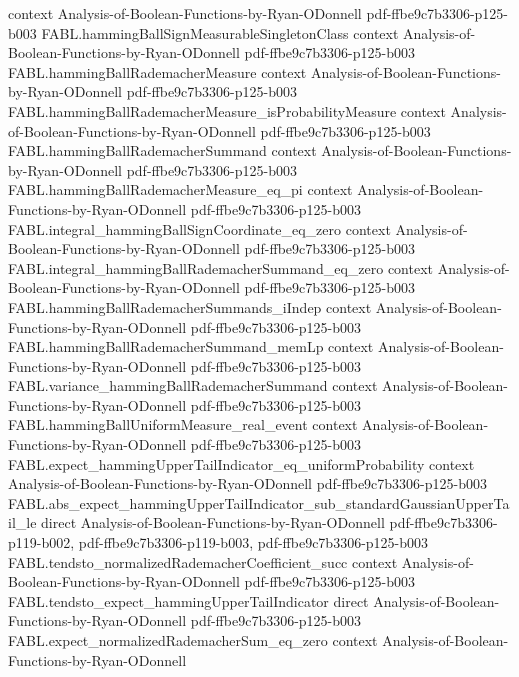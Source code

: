 \begin{theorem}
  {context}
  {Analysis-of-Boolean-Functions-by-Ryan-ODonnell}
  {pdf-ffbe9c7b3306-p125-b003}
\proofstep
  {FABL.hammingBallSignMeasurableSingletonClass}
  {context}
  {Analysis-of-Boolean-Functions-by-Ryan-ODonnell}
  {pdf-ffbe9c7b3306-p125-b003}
\proofstep
  {FABL.hammingBallRademacherMeasure}
  {context}
  {Analysis-of-Boolean-Functions-by-Ryan-ODonnell}
  {pdf-ffbe9c7b3306-p125-b003}
\proofstep
  {FABL.hammingBallRademacherMeasure_isProbabilityMeasure}
  {context}
  {Analysis-of-Boolean-Functions-by-Ryan-ODonnell}
  {pdf-ffbe9c7b3306-p125-b003}
\proofstep
  {FABL.hammingBallRademacherSummand}
  {context}
  {Analysis-of-Boolean-Functions-by-Ryan-ODonnell}
  {pdf-ffbe9c7b3306-p125-b003}
\proofstep
  {FABL.hammingBallRademacherMeasure_eq_pi}
  {context}
  {Analysis-of-Boolean-Functions-by-Ryan-ODonnell}
  {pdf-ffbe9c7b3306-p125-b003}
\proofstep
  {FABL.integral_hammingBallSignCoordinate_eq_zero}
  {context}
  {Analysis-of-Boolean-Functions-by-Ryan-ODonnell}
  {pdf-ffbe9c7b3306-p125-b003}
\proofstep
  {FABL.integral_hammingBallRademacherSummand_eq_zero}
  {context}
  {Analysis-of-Boolean-Functions-by-Ryan-ODonnell}
  {pdf-ffbe9c7b3306-p125-b003}
\proofstep
  {FABL.hammingBallRademacherSummands_iIndep}
  {context}
  {Analysis-of-Boolean-Functions-by-Ryan-ODonnell}
  {pdf-ffbe9c7b3306-p125-b003}
\proofstep
  {FABL.hammingBallRademacherSummand_memLp}
  {context}
  {Analysis-of-Boolean-Functions-by-Ryan-ODonnell}
  {pdf-ffbe9c7b3306-p125-b003}
\proofstep
  {FABL.variance_hammingBallRademacherSummand}
  {context}
  {Analysis-of-Boolean-Functions-by-Ryan-ODonnell}
  {pdf-ffbe9c7b3306-p125-b003}
\proofstep
  {FABL.hammingBallUniformMeasure_real_event}
  {context}
  {Analysis-of-Boolean-Functions-by-Ryan-ODonnell}
  {pdf-ffbe9c7b3306-p125-b003}
\proofstep
  {FABL.expect_hammingUpperTailIndicator_eq_uniformProbability}
  {context}
  {Analysis-of-Boolean-Functions-by-Ryan-ODonnell}
  {pdf-ffbe9c7b3306-p125-b003}
\proofstep
  {FABL.abs_expect_hammingUpperTailIndicator_sub_standardGaussianUpperTail_le}
  {direct}
  {Analysis-of-Boolean-Functions-by-Ryan-ODonnell}
  {pdf-ffbe9c7b3306-p119-b002,
    pdf-ffbe9c7b3306-p119-b003,
    pdf-ffbe9c7b3306-p125-b003}
\proofstep
  {FABL.tendsto_normalizedRademacherCoefficient_succ}
  {context}
  {Analysis-of-Boolean-Functions-by-Ryan-ODonnell}
  {pdf-ffbe9c7b3306-p125-b003}
\proofstep
  {FABL.tendsto_expect_hammingUpperTailIndicator}
  {direct}
  {Analysis-of-Boolean-Functions-by-Ryan-ODonnell}
  {pdf-ffbe9c7b3306-p125-b003}
\proofstep
  {FABL.expect_normalizedRademacherSum_eq_zero}
  {context}
  {Analysis-of-Boolean-Functions-by-Ryan-ODonnell}

\end{theorem}
